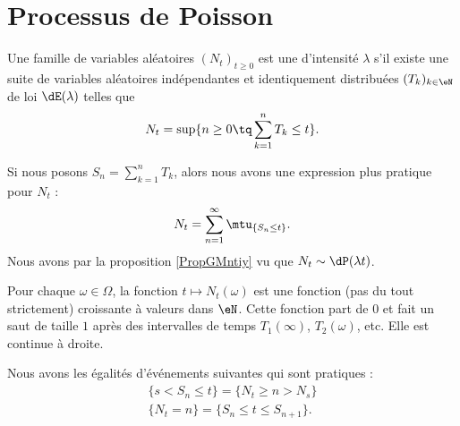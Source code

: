 
\section{Processus de Poisson}
\label{SecHxbtzQ}

\begin{definition}
    Une famille de variables aléatoires \( (N_t)_{t\geq 0}\) est une  d'intensité \( \lambda\) s'il existe une suite de variables aléatoires indépendantes et identiquement distribuées \( (T_k)_{k\in \eN}\) de loi \( \dE(\lambda)\) telles que 
    \begin{equation}
        N_t=\sup\{ n\geq 0\tq \sum_{k=1}^nT_k\leq t \}.
    \end{equation}
\end{definition}
Si nous posons \( S_n=\sum_{k=1}^nT_k\), alors nous avons une expression plus pratique pour \( N_t\) :
\begin{equation}
    N_t=\sum_{n=1}^{\infty}\mtu_{\{ S_n\leq t \}}.
\end{equation}
Nous avons par la proposition \ref{PropGMntiy} vu que \( N_t\sim\dP(\lambda t)\).


Pour chaque \( \omega\in \Omega\), la fonction \( t\mapsto N_t(\omega)\) est une fonction (pas du tout strictement) croissante à valeurs dans $\eN$. Cette fonction part de \( 0\) et fait un saut de taille \( 1\) après des intervalles de temps \( T_1(\infty)\), \( T_2(\omega)\), etc. Elle est continue à droite.

Nous avons les égalités d'événements suivantes qui sont pratiques :
\begin{subequations}
    \begin{align}
        \{ s<S_n\leq t \}=\{ N_t\geq n>N_s \}\\
        \{ N_t=n \}=\{ S_n\leq t\leq S_{n+1} \}.
    \end{align}
\end{subequations}

